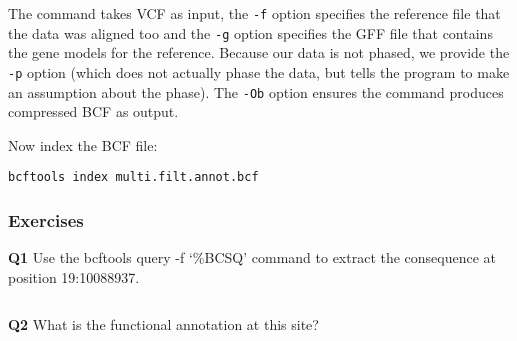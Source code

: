 \documentclass[11pt]{article}
\makeatletter
\newcommand{\boxspacing}{\kern\kvtcb@left@rule\kern\kvtcb@boxsep}
\newcommand{\prompt}[4]{
        {\ttfamily\llap{{\color{#2}[#3]:\hspace{3pt}#4}}\vspace{-\baselineskip}}
    }
\makeatother
\begin{document}
    The command takes VCF as input, the \texttt{-f} option specifies the
reference file that the data was aligned too and the \texttt{-g} option
specifies the GFF file that contains the gene models for the reference.
Because our data is not phased, we provide the \texttt{-p} option (which
does not actually phase the data, but tells the program to make an
assumption about the phase). The \texttt{-Ob} option ensures the command
produces compressed BCF as output.

    Now index the BCF file:

    \begin{tcolorbox}[breakable, size=fbox, boxrule=1pt, pad at break*=1mm,colback=cellbackground, colframe=cellborder]
\prompt{In}{incolor}{ }{\boxspacing}
\begin{Verbatim}[commandchars=\\\{\}]
bcftools index multi.filt.annot.bcf
\end{Verbatim}
\end{tcolorbox}

    \hypertarget{exercises}{%
\subsubsection{Exercises}\label{exercises}}

\textbf{Q1} Use the bcftools query -f `\%BCSQ\n' command to extract the
consequence at position 19:10088937.

    \begin{tcolorbox}[breakable, size=fbox, boxrule=1pt, pad at break*=1mm,colback=cellbackground, colframe=cellborder]
\prompt{In}{incolor}{ }{\boxspacing}
\begin{Verbatim}[commandchars=\\\{\}]

\end{Verbatim}
\end{tcolorbox}

    \textbf{Q2} What is the functional annotation at this site?

    \begin{tcolorbox}[breakable, size=fbox, boxrule=1pt, pad at break*=1mm,colback=cellbackground, colframe=cellborder]
\prompt{In}{incolor}{ }{\boxspacing}
\begin{Verbatim}[commandchars=\\\{\}]

\end{Verbatim}
\end{tcolorbox}
\end{document}

